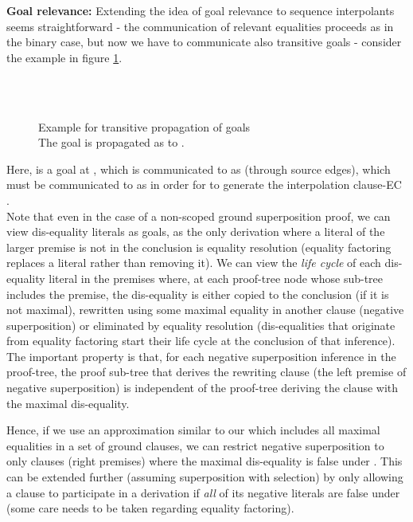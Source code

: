 \textbf{Goal relevance:}
Extending the idea of goal relevance to sequence interpolants seems straightforward - the communication of relevant equalities proceeds as in the binary case, but now we have to communicate also transitive goals - consider the  example in figure \ref{example_4.2.2.3}.

\begin{figure}
\\
\\
\caption{Example for transitive propagation of goals\\
The goal  is propagated as  to .}
\label{example_4.2.2.3}
\end{figure}

\noindent
Here,  is a goal at , which is communicated to  as 
 (through source edges), 
which must be communicated to  as  in order for  to generate the interpolation clause-EC .\\
Note that even in the case of a non-scoped ground superposition proof, we can view dis-equality literals as goals, 
as the only derivation where a literal of the larger premise is not in the conclusion is equality resolution (equality factoring replaces a literal rather than removing it). We can view the \emph{life cycle} of each dis-equality literal in the premises where, at each proof-tree node whose sub-tree includes the premise, the dis-equality is either copied to the conclusion (if it is not maximal), rewritten using some maximal equality in another clause (negative superposition) or eliminated by equality resolution (dis-equalities that originate from equality factoring start their life cycle at the conclusion of that inference). \\
The important property is that, for each negative superposition inference in the proof-tree, the proof sub-tree that derives the rewriting clause (the left premise of negative superposition) is independent of the proof-tree deriving the clause with the maximal dis-equality.

Hence, if we use an approximation similar to our  which includes all maximal equalities in a set of ground clauses, 
we can restrict negative superposition to only clauses (right premises) where the maximal dis-equality is false under . 
This can be extended further (assuming superposition with selection) by only allowing a clause to participate in a derivation if \emph{all} of its negative literals are false under  (some care needs to be taken regarding equality factoring).

